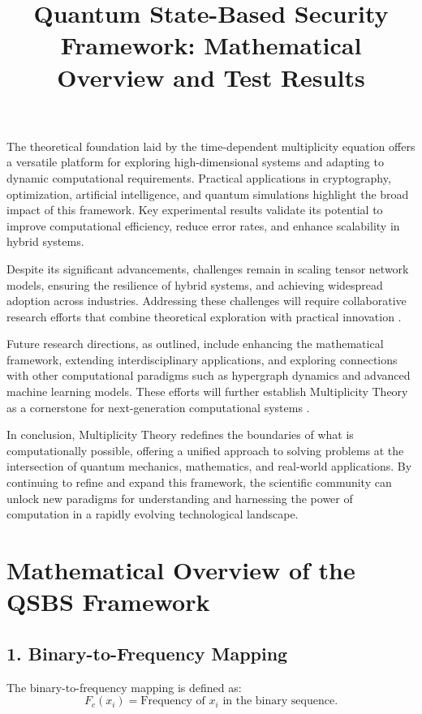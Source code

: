 \documentclass{article}
\theoremstyle{plain}
\begin{document}
The theoretical foundation laid by the time-dependent multiplicity equation offers a versatile platform for exploring high-dimensional systems and adapting to dynamic computational requirements. Practical applications in cryptography, optimization, artificial intelligence, and quantum simulations highlight the broad impact of this framework. Key experimental results validate its potential to improve computational efficiency, reduce error rates, and enhance scalability in hybrid systems.

Despite its significant advancements, challenges remain in scaling tensor network models, ensuring the resilience of hybrid systems, and achieving widespread adoption across industries. Addressing these challenges will require collaborative research efforts that combine theoretical exploration with practical innovation \cite{preskill2018quantum}.

Future research directions, as outlined, include enhancing the mathematical framework, extending interdisciplinary applications, and exploring connections with other computational paradigms such as hypergraph dynamics and advanced machine learning models. These efforts will further establish Multiplicity Theory as a cornerstone for next-generation computational systems \cite{wolfram2020hypergraph, biamonte2017tensor}.

In conclusion, Multiplicity Theory redefines the boundaries of what is computationally possible, offering a unified approach to solving problems at the intersection of quantum mechanics, mathematics, and real-world applications. By continuing to refine and expand this framework, the scientific community can unlock new paradigms for understanding and harnessing the power of computation in a rapidly evolving technological landscape.
\title{Quantum State-Based Security Framework: Mathematical Overview and Test Results}
\author{}
\date{}
\maketitle


\section*{Mathematical Overview of the QSBS Framework}

\subsection*{1. Binary-to-Frequency Mapping}
The binary-to-frequency mapping is defined as:
\begin{equation}
F_c(x_i) = \text{Frequency of } x_i \text{ in the binary sequence.}
\end{equation}
\end{document}
